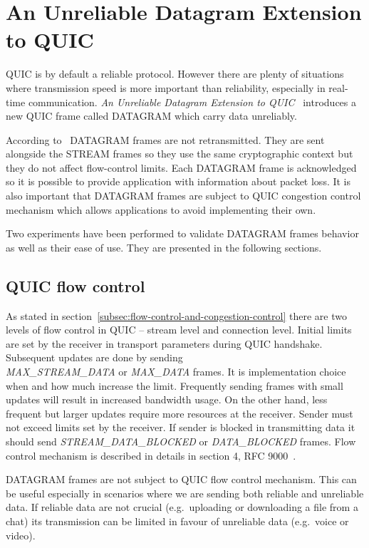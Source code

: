 \section{An Unreliable Datagram Extension to QUIC}
\label{sec:datagrams}
QUIC is by default a reliable protocol.
However there are plenty of situations where transmission speed is more important than reliability, especially in real-time communication.
\textit{An Unreliable Datagram Extension to QUIC}~\cite{ietf-quic-datagram-02} introduces a new QUIC frame called DATAGRAM which carry data unreliably.

According to~\cite{ietf-quic-datagram-02} DATAGRAM frames are not retransmitted.
They are sent alongside the STREAM frames so they use the same cryptographic context but they do not affect flow-control limits.
Each DATAGRAM frame is acknowledged so it is possible to provide application with information about packet loss.
It is also important that DATAGRAM frames are subject to QUIC congestion control mechanism which allows applications to avoid implementing their own.

Two experiments have been performed to validate DATAGRAM frames behavior as well as their ease of use.
They are presented in the following sections.

\subsection{QUIC flow control}
\label{subsec:quic-flow-control}
As stated in section~\ref{subsec:flow-control-and-congestion-control} there are two levels of flow control in QUIC -- stream level and connection level.
Initial limits are set by the receiver in transport parameters during QUIC handshake.
Subsequent updates are done by sending \\ \textit{MAX\_STREAM\_DATA} or \textit{MAX\_DATA} frames.
It is implementation choice when and how much increase the limit.
Frequently sending frames with small updates will result in increased bandwidth usage.
On the other hand, less frequent but larger updates require more resources at the receiver.
Sender must not exceed limits set by the receiver.
If sender is blocked in transmitting data it should send \textit{STREAM\_DATA\_BLOCKED} or \textit{DATA\_BLOCKED} frames.
Flow control mechanism is described in details in section 4, RFC 9000~\cite{rfc9000}.

DATAGRAM frames are not subject to QUIC flow control mechanism.
This can be useful especially in scenarios where we are sending both reliable and unreliable data.
If reliable data are not crucial (e.g.\ uploading or downloading a file from a chat) its transmission can be limited in favour of unreliable data (e.g.\ voice or video).

